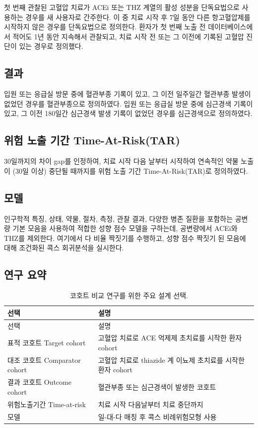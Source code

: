 \documentclass[10.5pt]{book}
\theoremstyle{definition}
\theoremstyle{definition}
\theoremstyle{definition}
\theoremstyle{remark}
\begin{document}
첫 번째 관찰된 고혈압 치료가 ACEi 또는 THZ 계열의 활성 성분을
단독요법으로 사용하는 경우를 새 사용자로 간주한다. 이 중 치료 시작 후
7일 동안 다른 항고혈압제를 시작하지 않은 경우를 단독요법으로 정의한다.
환자가 첫 번째 노출 전 데이터베이스에서 적어도 1년 동안 지속해서
관찰되고, 치료 시작 전 또는 그 이전에 기록된 고혈압 진단이 있는 경우로
정의했다.

\subsection{결과}\label{-2}

입원 또는 응급실 방문 중에 혈관부종 기록이 있고, 그 이전 일주일간
혈관부종 발생이 없었던 경우를 혈관부종으로 정의하였다. 입원 또는 응급실
방문 중에 심근경색 기록이 있고, 그 이전 180일간 심근경색 발생 기록이
없었던 경우를 심근경색으로 정의하였다.

\subsection{위험 노출 기간 Time-At-Risk(TAR)}\label{---time-at-risktar}

30일까지의 차이 gap를 인정하여, 치료 시작 다음 날부터 시작하여 연속적인
약물 노출이 (30일 이상) 중단될 때까지를 위험 노출 기간
Time-At-Risk(TAR)로 정의하였다.

\subsection{모델}

인구학적 특징, 상태, 약물, 절차, 측정, 관찰 결과, 다양한 병존 질환을
포함하는 공변량 기본 모음을 사용하여 적합한 성향 점수 모델을 구하는데,
공변량에서 ACEi와 THZ를 제외한다. 여기에서 다 비율 짝짓기를 수행하고,
성향 점수 짝짓기 된 모음에 대해 조건화된 콕스 회귀분석을 실시한다.

\subsection{연구 요약}\label{-}

\begin{longtable}[]{@{}ll@{}}
\caption{\label{tab:aceChoices} 코호트 비교 연구를 위한 주요 설계
선택.}\tabularnewline
\toprule
선택 & 설명\tabularnewline
\midrule
\endfirsthead
\toprule
선택 & 설명\tabularnewline
\midrule
\endhead
표적 코호트 Target cohort & 고혈압 치료로 ACE 억제제 초치료를 시작한
환자 cohort\tabularnewline
대조 코호트 Comparator cohort & 고혈압 치료로 thiazide 계 이뇨제
초치료를 시작한 환자 cohort\tabularnewline
결과 코호트 Outcome cohort & 혈관부종 또는 심근경색이 발생한
코호트\tabularnewline
위험노출기간 Time-at-risk & 치료 시작 다음날부터 치료
중단까지\tabularnewline
모델 & 일-대-다 매칭 후 콕스 비례위험모형 사용\tabularnewline
\bottomrule
\end{longtable}
\end{document}
